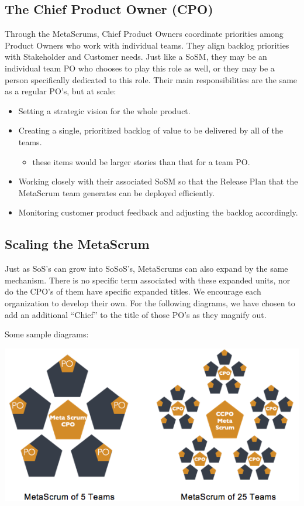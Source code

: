\documentclass[12pt,a4paper,parskip=full]{scrartcl}
\begin{document}
\subsection{The Chief Product Owner (CPO)}
Through the MetaScrums, Chief Product Owners coordinate priorities among
Product Owners who work with individual teams. They align backlog
priorities with Stakeholder and Customer needs. Just like a SoSM, they may
be an individual team PO who chooses to play this role as well, or they may
be a person specifically dedicated to this role. Their main
responsibilities are the same as a regular PO's, but at scale:
\begin{itemize}
\item Setting a strategic vision for the whole product.
\item Creating a single, prioritized backlog of value to be delivered by
all of the teams.
\begin{itemize}
\item these items would be larger stories than that for a team PO.
\end{itemize}
\item Working closely with their associated SoSM so that the Release Plan
that the MetaScrum team generates can be deployed efficiently.
\item Monitoring customer product feedback and adjusting the backlog
accordingly.
\end{itemize}

\subsection{Scaling the MetaScrum}
Just as SoS's can grow into SoSoS's, MetaScrums can also expand by the same
mechanism. There is no specific term associated with these expanded units,
nor do the CPO's of them have specific expanded titles. We encourage each
organization to develop their own. For the following diagrams, we have
chosen to add an additional ``Chief'' to the title of those PO's as they
magnify out.

Some sample diagrams:

\includegraphics[width=1.0\linewidth]{MetaScrum-R2.png}
\end{document}
